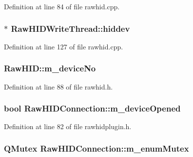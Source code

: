 Definition at line 84 of file rawhid.\-cpp.

\hypertarget{group___raw_h_i_d_plugin_ga7ce382fd2ebb17e10007aed01dea1d6f}{
\subsubsection[{hiddev}]{$\ast$ Raw\-H\-I\-D\-Write\-Thread\-::hiddev\hspace{0.3cm}{\ttfamily [protected]}}}\label{group___raw_h_i_d_plugin_ga7ce382fd2ebb17e10007aed01dea1d6f}


Definition at line 127 of file rawhid.\-cpp.

\hypertarget{group___raw_h_i_d_plugin_ga0dde2d900a5f9cbd059e528de3f0c73b}{
\subsubsection[{m\-\_\-device\-No}]{ Raw\-H\-I\-D\-::m\-\_\-device\-No\hspace{0.3cm}{\ttfamily [protected]}}}\label{group___raw_h_i_d_plugin_ga0dde2d900a5f9cbd059e528de3f0c73b}


Definition at line 88 of file rawhid.\-h.

\hypertarget{group___raw_h_i_d_plugin_ga043f346d34d71eb80f1e33ab78a82286}{
\subsubsection[{m\-\_\-device\-Opened}]{\setlength{\rightskip}{0pt plus 5cm}bool Raw\-H\-I\-D\-Connection\-::m\-\_\-device\-Opened\hspace{0.3cm}{\ttfamily [protected]}}}\label{group___raw_h_i_d_plugin_ga043f346d34d71eb80f1e33ab78a82286}


Definition at line 82 of file rawhidplugin.\-h.

\hypertarget{group___raw_h_i_d_plugin_ga13d9bdfab2ab9e3a4f4cd08b53a2f105}{
\subsubsection[{m\-\_\-enum\-Mutex}]{\setlength{\rightskip}{0pt plus 5cm}Q\-Mutex Raw\-H\-I\-D\-Connection\-::m\-\_\-enum\-Mutex\hspace{0.3cm}{\ttfamily [protected]}}}\label{group___raw_h_i_d_plugin_ga13d9bdfab2ab9e3a4f4cd08b53a2f105}



